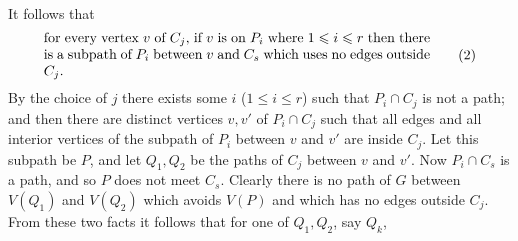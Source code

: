 It follows that
\begin{equation*}
\parbox{0.8\linewidth}{for every vertex $v$ of $C_j$, if $v$ is on $P_i$ where $1 \le i \le r$ then there is a subpath of $P_i$ between $v$ and $C_s$ which uses no edges outside $C_j$.} \tag{2}
\end{equation*}
By the choice of $j$ there exists some $i$ ($1 \le i \le r$) such that $P_i \cap C_j$ is not a path; and then there are distinct vertices $v, v'$ of $P_i \cap C_j$ such that all edges and all interior vertices of the subpath of $P_i$ between $v$ and $v'$ are inside $C_j$. Let this subpath be $P$, and let $Q_1, Q_2$ be the paths of $C_j$ between $v$ and $v'$. Now $P_i \cap C_s$ is a path, and so $P$ does not meet $C_s$. Clearly there is no path of $G$ between $V(Q_1)$ and $V(Q_2)$ which avoids $V(P)$ and which has no edges outside $C_j$. From these two facts it follows that for one of $Q_1, Q_2$, say $Q_k$,
